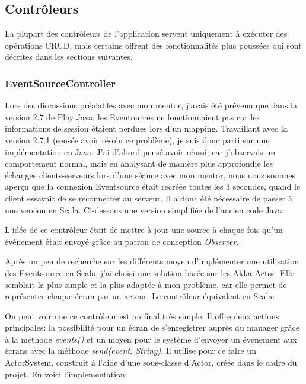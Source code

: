 \documentclass[french]{article}
\begin{document}
\newpage
\subsection{Contrôleurs}

La plupart des contrôleurs de l'application servent uniquement à exécuter des opérations CRUD, mais certains offrent des fonctionnalités plus poussées qui sont décrites dans les sections suivantes. 

\subsubsection{EventSourceController}

Lors des discussions préalables avec mon mentor, j'avais été prévenu que dans la version 2.7 de Play Java, les Eventources ne fonctionnaient pas car les informations de session étaient perdues lors d'un mapping. Travaillant avec la version 2.7.1 (sensée avoir résolu ce problème), je suis donc parti sur une implémentation en Java. J'ai d'abord pensé avoir réussi, car j'observais un comportement normal, mais en analysant de manière plus approfondie les échanges clients-serveurs lors d'une séance avec mon mentor, nous nous sommes aperçu que la connexion Eventsource était recréée toutes les 3 secondes, quand le client essayait de se reconnecter au serveur. Il a donc été nécessaire de passer à une version en Scala.\newline
Ci-dessous une version simplifiée de l'ancien code Java:



L'idée de ce contrôleur était de mettre à jour une source à chaque fois qu'un événement était envoyé grâce au patron de conception \textit{Observer}. 
\newpage

Après un peu de recherche sur les différents moyen d'implémenter une utilisation des Eventsource en Scala, j'ai choisi une solution basée sur les Akka Actor. Elle semblait la plus simple et la plus adaptée à mon problème, car elle permet de représenter chaque écran par un acteur. \newline
Le contrôleur équivalent en Scala:



On peut voir que ce contrôleur est au final très simple. Il offre deux actions principales: la possibilité pour un écran de s'enregistrer auprès du manager grâce à la méthode \textit{events()} et un moyen pour le système d'envoyer un événement aux écrans avec la méthode \textit{send(event: String)}. \newline
Il utilise pour ce faire un ActorSystem, construit à l'aide d'une sous-classe d'Actor, créée dans le cadre du projet. En voici l'implémentation:
\end{document}
